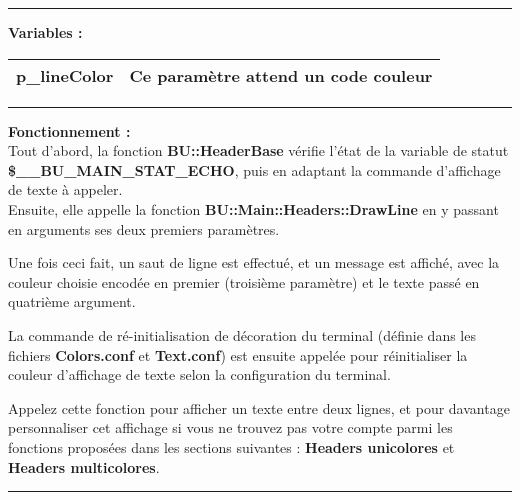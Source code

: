 \documentclass[a4paper,10pt]{article}
\begin{document}
\par\noindent\rule{\textwidth}{0.4pt}

\textbf{Variables :}\\[1\baselineskip]
\begin{tabular}{|l|l|}
\hline
\textbf{\color{orange}p\_lineColor} & Ce paramètre attend un code couleur \\ 
\hline
\end{tabular}

\par\noindent\rule{\textwidth}{0.4pt}

\begin{justify}
    \textbf{Fonctionnement :}\\
    Tout d'abord, la fonction \textbf{\color{mauve}BU::HeaderBase} vérifie l'état de la variable de statut \textbf{\color{orange}\$\_\_BU\_MAIN\_STAT\_ECHO}, puis en adaptant la commande d'affichage de texte à appeler.\\[1\baselineskip]

    Ensuite, elle appelle la fonction \textbf{\color{mauve}BU::Main::Headers::DrawLine} en y passant en arguments ses deux premiers paramètres.
\end{justify}

\begin{justify}
    Une fois ceci fait, un saut de ligne est effectué, et un message est affiché, avec la couleur choisie encodée en premier (troisième paramètre) et le texte passé en quatrième argument.
\end{justify}

\begin{justify}
    La commande de ré-initialisation de décoration du terminal (définie dans les fichiers \textbf{\color{lime}Colors.conf} et \textbf{\color{lime}Text.conf}) est ensuite appelée pour réinitialiser la couleur d'affichage de texte selon la configuration du terminal.
\end{justify}

\begin{justify}
    Appelez cette fonction pour afficher un texte entre deux lignes, et pour davantage personnaliser cet affichage si vous ne trouvez pas votre compte parmi les fonctions proposées dans les sections suivantes : \textbf{\color{green}Headers unicolores} et \textbf{\color{green}Headers multicolores}.
\end{justify}

\par\noindent\rule{\textwidth}{0.4pt}
\end{document}
